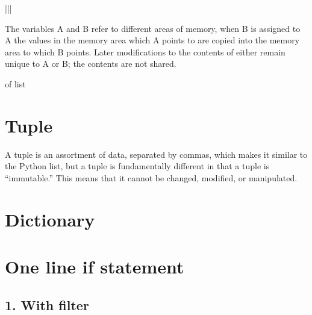 \documentclass[letterpaper,12pt,english]{sphinxmanual}
\def\X{\mathbf{X}}
\begin{document}
\begin{savenotes}
\begin{tabular}[t]{|*{2}{\X{1}{2}|}}
\begin{footnote}[1]
\begin{quote}
\begin{sphinxfigure-in-table}
\noindent{}
\end{sphinxfigure-in-table}\relax
\end{quote}

The variables A and B refer to different areas of memory, when B is assigned to A the values in the memory area which A points to are copied into the memory area to which B points. Later modifications to the contents of either remain unique to A or B; the contents are not shared.
%
\end{footnote} of list
\\
\hline
\end{tabular}
\par
\sphinxattableend\end{savenotes}


\section{Tuple}
\label{\detokenize{struct:tuple}}
A tuple is an assortment of data, separated by commas, which makes it similar to the Python list, but a tuple is fundamentally different in that a tuple is “immutable.” This means that it cannot be changed, modified, or manipulated.


\section{Dictionary}
\label{\detokenize{struct:dictionary}}

\section{One line if statement}
\label{\detokenize{struct:one-line-if-statement}}

\subsection{1. With filter}
\label{\detokenize{struct:with-filter}}
\begin{quote}

\begin{sphinxVerbatim}[commandchars=\\\{\}]
\PYG{p}{[}        \PYG{p}{]}
\end{sphinxVerbatim}
\end{quote}
\end{document}
